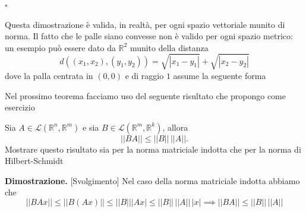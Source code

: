 \hfill $\square$
%
\begin{remark}
    Questa dimostrazione è valida, in realtà, per ogni spazio vettoriale munito di norma. Il fatto che le palle siano convesse non è valido per ogni spazio metrico: un esempio può essere dato da $\mathbb{R}^2$ munito della distanza
    \[
    d((x_1, x_2), (y_1, y_2)) = \sqrt{|x_1 - y_1|} + \sqrt{|x_2 - y_2|}
    \]
    dove la palla centrata in $(0, 0)$ e di raggio $1$ assume la seguente forma
    \begin{figure}[H]
        \centering
    \end{figure}
\end{remark}
%
Nel prossimo teorema facciamo uso del seguente risultato che propongo come esercizio
%
\vspace{0.5cm}
\begin{exercise}
    Sia $A \in \mathcal{L}(\mathbb{R}^n, \mathbb{R}^m)$ e sia $B \in \mathcal{L}(\mathbb{R}^m, \mathbb{R}^k)$, allora
    \[
        || BA || \leq || B || \, || A ||.
    \]
    Mostrare questo risultato sia per la norma matriciale indotta che per la norma di Hilbert-Schmidt
\end{exercise}
%
\noindent \textbf{Dimostrazione. } [Svolgimento]
    Nel caso della norma matriciale indotta abbiamo che
    \[
    || BAx || \leq || B(Ax) || \leq || B || |Ax| \leq || B || \, || A || \, |x| \implies || BA || \leq || B || \, || A ||
    \]
